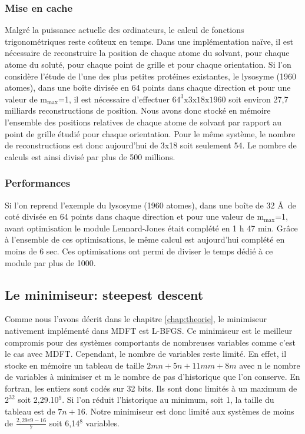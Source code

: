 \subsubsection{Mise en cache}
Malgré la puissance actuelle des ordinateurs, le calcul de fonctions trigonométriques reste coûteux en temps. Dans une implémentation naïve, il est nécessaire de reconstruire la position de chaque atome du solvant, pour chaque atome du soluté, pour chaque point de grille et pour chaque orientation. Si l'on considère l'étude de l'une des plus petites protéines existantes, le lysosyme (1960 atomes), dans une boîte divisée en 64 points dans chaque direction et pour une valeur de $\mathrm{m}_\mathrm{max}$=1, il est nécessaire d'effectuer $64^3\mathrm{x}3\mathrm{x}18\mathrm{x}1960$ soit environ 27,7 milliards reconstructions de position. Nous avons donc stocké en mémoire l'ensemble des positions relatives de chaque atome de solvant par rapport au point de grille étudié pour chaque orientation. Pour le même système, le nombre de reconstructions est donc aujourd'hui de 3x18 soit seulement 54. Le nombre de calculs est ainsi divisé par plus de 500 millions.


\subsubsection{Performances}
Si l'on reprend l'exemple du lysosyme (1960 atomes), dans une boîte de 32 \AA\ de coté divisée en 64 points dans chaque direction et pour une valeur de $\mathrm{m}_\mathrm{max}$=1, avant optimisation le module Lennard-Jones était complété en 1 h 47 min. Grâce à l'ensemble de ces optimisations, le même calcul est aujourd'hui complété en moins de 6 sec. Ces optimisations ont permi de diviser le temps dédié à ce module par plus de 1000.


\subsection{Le minimiseur: steepest descent}
Comme nous l'avons décrit dans le chapitre \ref{chap:theorie}, le minimiseur nativement implémenté dans MDFT est L-BFGS. Ce minimiseur est le meilleur compromis pour des systèmes comportants de nombreuses variables comme c'est le cas avec MDFT. Cependant, le nombre de variables reste limité. En effet, il stocke en mémoire un tableau de taille $2mn + 5n + 11mm + 8m$ avec n le nombre de variables à minimiser et m le nombre de pas d'historique que l'on conserve. En fortran, les entiers sont codés sur 32 bits. Ils sont donc limités à un maximum de $2^{32}$ soit 2,29.10$^9$. Si l'on réduit l'historique au minimum, soit 1, la taille du tableau est de $7n+16$. Notre minimiseur est donc limité aux systèmes de moins de $\frac{2,29e9-16}{7}$ soit 6,14$^{8}$ variables. 

